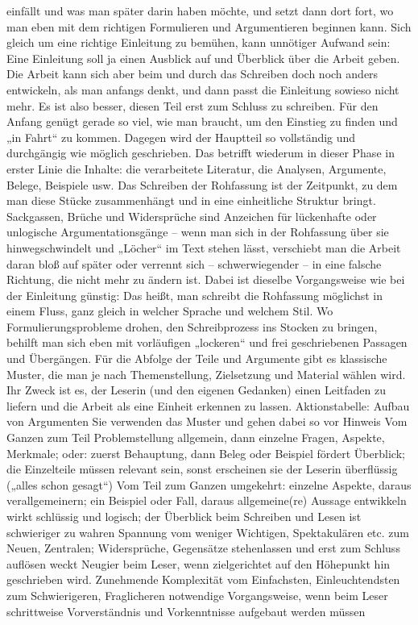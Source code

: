 \documentclass[]{book}
\theoremstyle{definition}
\theoremstyle{definition}
\theoremstyle{definition}
\theoremstyle{remark}
\begin{document}
einfällt und was man später darin haben möchte, und setzt dann dort
fort, wo man eben mit dem richtigen Formulieren und Argumentieren
beginnen kann. Sich gleich um eine richtige Einleitung zu bemühen, kann
unnötiger Aufwand sein: Eine Einleitung soll ja einen Ausblick auf und
Überblick über die Arbeit geben. Die Arbeit kann sich aber beim und
durch das Schreiben doch noch anders entwickeln, als man anfangs denkt,
und dann passt die Einleitung sowieso nicht mehr. Es ist also besser,
diesen Teil erst zum Schluss zu schreiben. Für den Anfang genügt gerade
so viel, wie man braucht, um den Einstieg zu finden und „in Fahrt`` zu
kommen. Dagegen wird der Hauptteil so vollständig und durchgängig wie
möglich geschrieben. Das betrifft wiederum in dieser Phase in erster
Linie die Inhalte: die verarbeitete Literatur, die Analysen, Argumente,
Belege, Beispiele usw. Das Schreiben der Rohfassung ist der Zeitpunkt,
zu dem man diese Stücke zusammenhängt und in eine einheitliche Struktur
bringt. Sackgassen, Brüche und Widersprüche sind Anzeichen für
lückenhafte oder unlogische Argumentationsgänge -- wenn man sich in der
Rohfassung über sie hinwegschwindelt und „Löcher`` im Text stehen lässt,
verschiebt man die Arbeit daran bloß auf später oder verrennt sich --
schwerwiegender -- in eine falsche Richtung, die nicht mehr zu ändern
ist. Dabei ist dieselbe Vorgangsweise wie bei der Einleitung günstig:
Das heißt, man schreibt die Rohfassung möglichst in einem Fluss, ganz
gleich in welcher Sprache und welchem Stil. Wo Formulierungsprobleme
drohen, den Schreibprozess ins Stocken zu bringen, behilft man sich eben
mit vorläufigen „lockeren`` und frei geschriebenen Passagen und
Übergängen. Für die Abfolge der Teile und Argumente gibt es klassische
Muster, die man je nach Themenstellung, Zielsetzung und Material wählen
wird. Ihr Zweck ist es, der Leserin (und den eigenen Gedanken) einen
Leitfaden zu liefern und die Arbeit als eine Einheit erkennen zu lassen.
Aktionstabelle: Aufbau von Argumenten Sie verwenden das Muster und gehen
dabei so vor Hinweis Vom Ganzen zum Teil Problemstellung allgemein, dann
einzelne Fragen, Aspekte, Merkmale; oder: zuerst Behauptung, dann Beleg
oder Beispiel fördert Überblick; die Einzelteile müssen relevant sein,
sonst erscheinen sie der Leserin überflüssig („alles schon gesagt``) Vom
Teil zum Ganzen umgekehrt: einzelne Aspekte, daraus verallgemeinern; ein
Beispiel oder Fall, daraus allgemeine(re) Aussage entwikkeln wirkt
schlüssig und logisch; der Überblick beim Schreiben und Lesen ist
schwieriger zu wahren Spannung vom weniger Wichtigen, Spektakulären etc.
zum Neuen, Zentralen; Widersprüche, Gegensätze stehenlassen und erst zum
Schluss auflösen weckt Neugier beim Leser, wenn zielgerichtet auf den
Höhepunkt hin geschrieben wird. Zunehmende Komplexität vom Einfachsten,
Einleuchtendsten zum Schwierigeren, Fraglicheren notwendige
Vorgangsweise, wenn beim Leser schrittweise Vorverständnis und
Vorkenntnisse aufgebaut werden müssen
\end{document}
